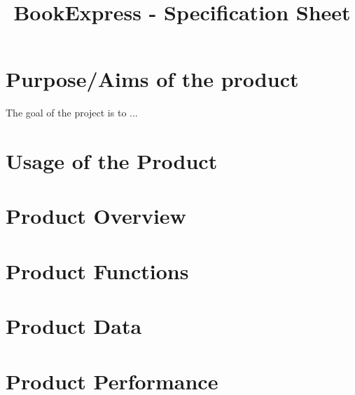 \documentclass[a4paper]{report}
\begin{document}
\title{BookExpress - Specification Sheet}
\maketitle
\tableofcontents

\chapter{Purpose/Aims of the product}
The goal of the project is to ...
\chapter{Usage of the Product}
\chapter{Product Overview}
\chapter{Product Functions}
\chapter{Product Data}
\chapter{Product Performance}
\end{document}
